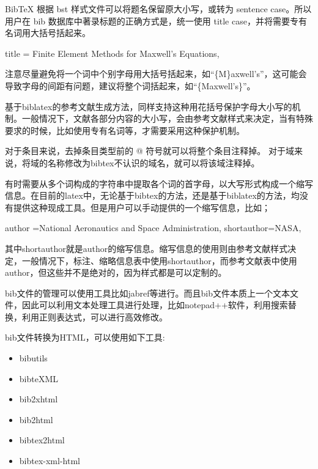 BibTeX 根据 bst 样式文件可以将题名保留原大小写，或转为 sentence
case。所以用户在 bib 数据库中著录标题的正确方式是，统一使用 title
case，并将需要专有名词用大括号括起来。

\begin{texlist}
title = {Finite Element Methods for {Maxwell's} Equations},
\end{texlist}

注意尽量避免将一个词中个别字母用大括号括起来，如``\{M\}axwell's''，这可能会导致字母的间距有问题，建议将整个词括起来，如``\{Maxwell's\}''。

基于biblatex的参考文献生成方法，同样支持这种用花括号保护字母大小写的机制。一般情况下，文献各部分内容的大小写，会由参考文献样式来决定，当有特殊要求的时候，比如使用专有名词等，才需要采用这种保护机制。




对于条目来说，去掉条目类型前的 @ 符号就可以将整个条目注释掉。
对于域来说，将域的名称修改为bibtex不认识的域名，就可以将该域注释掉。




有时需要从多个词构成的字符串中提取各个词的首字母，以大写形式构成一个缩写信息。在目前的latex中，无论基于bibtex的方法，还是基于biblatex的方法，均没有提供这种现成工具。但是用户可以手动提供的一个缩写信息，比如；

\begin{texlist}
author ={{National Aeronautics and Space Administration}},
shortauthor={NASA},
\end{texlist}

其中shortauthor就是author的缩写信息。缩写信息的使用则由参考文献样式决定，一般情况下，标注、缩略信息表中使用shortauthor，而参考文献表中使用author，但这些并不是绝对的，因为样式都是可以定制的。



bib文件的管理可以使用工具比如jabref等进行。而且bib文件本质上一个文本文件，因此可以利用文本处理工具进行处理，比如notepad++软件，利用搜索替换，利用正则表达式，可以进行高效修改。




bib文件转换为HTML，可以使用如下工具:
\begin{itemize}
  \item bibutils

  \item bibteXML

  \item bib2xhtml

  \item bib2html

  \item bibtex2html

  \item bibtex-xml-html
\end{itemize}



